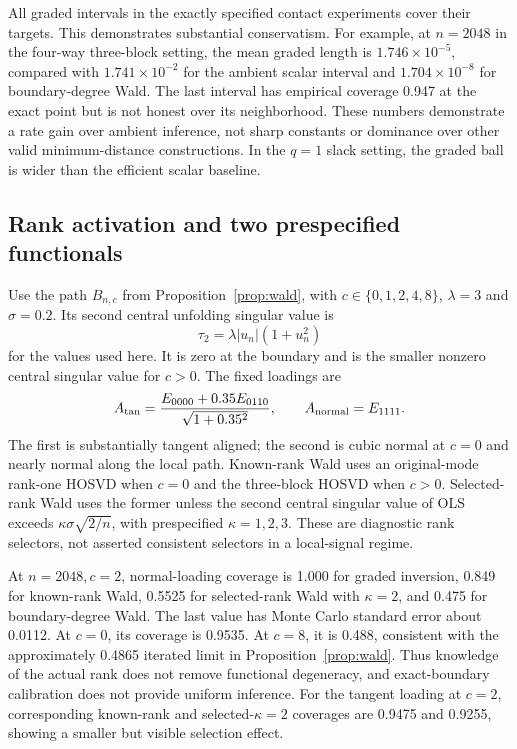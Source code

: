 All graded intervals in the exactly specified contact experiments cover their targets. This demonstrates substantial conservatism. For example, at $n=2048$ in the four-way three-block setting, the mean graded length is $1.746\times10^{-5}$, compared with $1.741\times10^{-2}$ for the ambient scalar interval and $1.704\times10^{-8}$ for boundary-degree Wald. The last interval has empirical coverage 0.947 at the exact point but is not honest over its neighborhood. These numbers demonstrate a rate gain over ambient inference, not sharp constants or dominance over other valid minimum-distance constructions. In the $q=1$ slack setting, the graded ball is wider than the efficient scalar baseline.

\subsection{Rank activation and two prespecified functionals}
Use the path $B_{n,c}$ from Proposition~\ref{prop:wald}, with $c\in\{0,1,2,4,8\}$, $\lambda=3$ and $\sigma=0.2$. Its second central unfolding singular value is
\[
 \tau_2=\lambda|u_n|(1+u_n^2)
\]
for the values used here. It is zero at the boundary and is the smaller nonzero central singular value for $c>0$. The fixed loadings are
\[
 A_{\rm tan}=\frac{E_{0000}+0.35E_{0110}}{\sqrt{1+0.35^2}},
 \qquad A_{\rm normal}=E_{1111}.
\]
The first is substantially tangent aligned; the second is cubic normal at $c=0$ and nearly normal along the local path. Known-rank Wald uses an original-mode rank-one HOSVD when $c=0$ and the three-block HOSVD when $c>0$. Selected-rank Wald uses the former unless the second central singular value of OLS exceeds $\kappa\sigma\sqrt{2/n}$, with prespecified $\kappa=1,2,3$. These are diagnostic rank selectors, not asserted consistent selectors in a local-signal regime.

At $n=2048,c=2$, normal-loading coverage is 1.000 for graded inversion, 0.849 for known-rank Wald, 0.5525 for selected-rank Wald with $\kappa=2$, and 0.475 for boundary-degree Wald. The last value has Monte Carlo standard error about 0.0112. At $c=0$, its coverage is 0.9535. At $c=8$, it is 0.488, consistent with the approximately 0.4865 iterated limit in Proposition~\ref{prop:wald}. Thus knowledge of the actual rank does not remove functional degeneracy, and exact-boundary calibration does not provide uniform inference. For the tangent loading at $c=2$, corresponding known-rank and selected-$\kappa=2$ coverages are 0.9475 and 0.9255, showing a smaller but visible selection effect.

